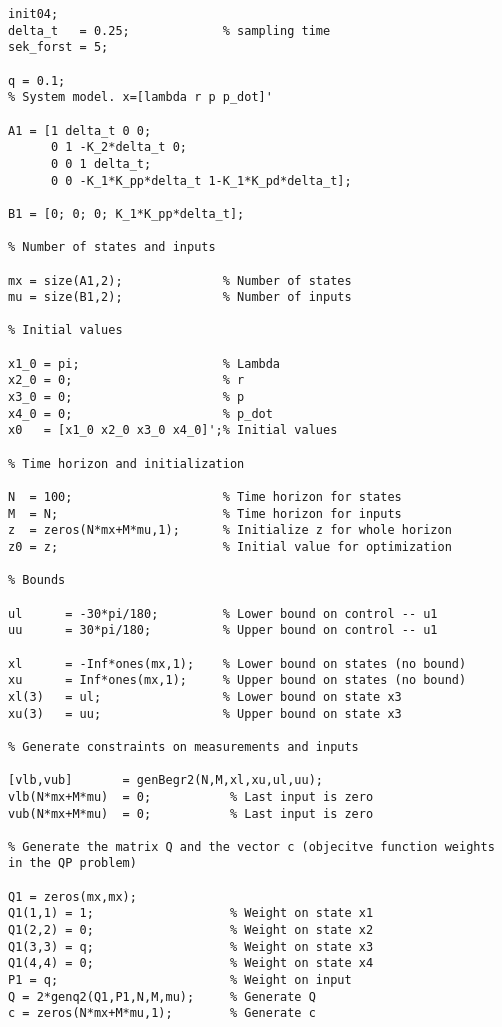 \begin{lstlisting}
init04;
delta_t	  = 0.25;             % sampling time
sek_forst = 5;

q = 0.1;
% System model. x=[lambda r p p_dot]'

A1 = [1 delta_t 0 0;
      0 1 -K_2*delta_t 0;
      0 0 1 delta_t;
      0 0 -K_1*K_pp*delta_t 1-K_1*K_pd*delta_t];
  
B1 = [0; 0; 0; K_1*K_pp*delta_t];

% Number of states and inputs

mx = size(A1,2);       		  % Number of states
mu = size(B1,2);              % Number of inputs

% Initial values

x1_0 = pi;                    % Lambda
x2_0 = 0;                     % r
x3_0 = 0;                     % p
x4_0 = 0;                     % p_dot
x0   = [x1_0 x2_0 x3_0 x4_0]';% Initial values

% Time horizon and initialization

N  = 100;                     % Time horizon for states
M  = N;                       % Time horizon for inputs
z  = zeros(N*mx+M*mu,1);      % Initialize z for whole horizon
z0 = z;                       % Initial value for optimization

% Bounds

ul 	    = -30*pi/180;         % Lower bound on control -- u1
uu 	    = 30*pi/180;          % Upper bound on control -- u1

xl      = -Inf*ones(mx,1);    % Lower bound on states (no bound)
xu      = Inf*ones(mx,1);     % Upper bound on states (no bound)
xl(3)   = ul;                 % Lower bound on state x3
xu(3)   = uu;                 % Upper bound on state x3

% Generate constraints on measurements and inputs

[vlb,vub]       = genBegr2(N,M,xl,xu,ul,uu);
vlb(N*mx+M*mu)  = 0;           % Last input is zero
vub(N*mx+M*mu)  = 0;           % Last input is zero

% Generate the matrix Q and the vector c (objecitve function weights in the QP problem) 

Q1 = zeros(mx,mx);
Q1(1,1) = 1;                   % Weight on state x1
Q1(2,2) = 0;                   % Weight on state x2
Q1(3,3) = q;                   % Weight on state x3
Q1(4,4) = 0;                   % Weight on state x4
P1 = q;                        % Weight on input
Q = 2*genq2(Q1,P1,N,M,mu);     % Generate Q
c = zeros(N*mx+M*mu,1);        % Generate c


\end{lstlisting}
